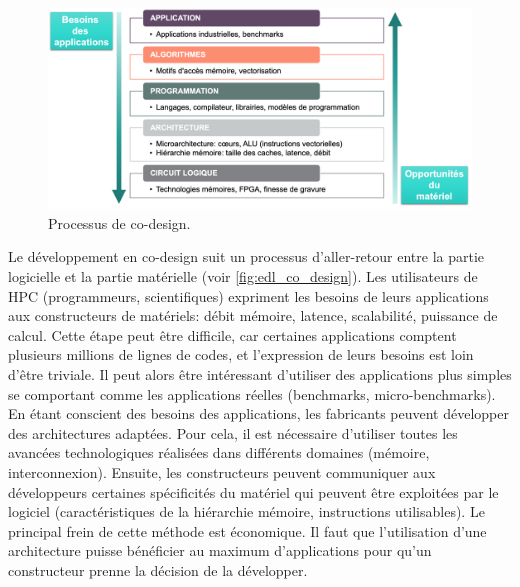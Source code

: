         \begin{figure}
        \center
        \includegraphics[width=14cm]{images/edl_co_design.png}
        \caption{\label{fig:edl_co_design} Processus de co-design.}
        \end{figure}
        
        Le développement en co-design suit un processus d'aller-retour entre la partie logicielle et la partie matérielle (voir \autoref{fig:edl_co_design}). Les utilisateurs de HPC (programmeurs, scientifiques) expriment les besoins de leurs applications aux constructeurs de matériels: débit mémoire, latence, scalabilité, puissance de calcul. Cette étape peut être difficile, car certaines applications comptent plusieurs millions de lignes de codes, et l'expression de leurs besoins est loin d'être triviale. Il peut alors être intéressant d'utiliser des applications plus simples se comportant comme les applications réelles (benchmarks, micro-benchmarks). 
        En étant conscient des besoins des applications, les fabricants peuvent développer des architectures adaptées. Pour cela, il est nécessaire d'utiliser toutes les avancées technologiques réalisées dans différents domaines (mémoire, interconnexion). Ensuite, les constructeurs peuvent communiquer aux développeurs certaines spécificités du matériel qui peuvent être exploitées par le logiciel (caractéristiques de la hiérarchie mémoire, instructions utilisables). Le principal frein de cette méthode est économique. Il faut que l'utilisation d'une architecture puisse bénéficier au maximum d'applications pour qu'un constructeur prenne la décision de la développer.
        

